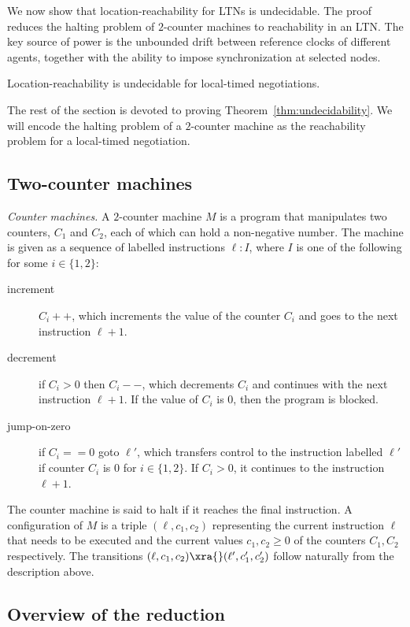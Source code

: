 We now show that location-reachability for LTNs is undecidable.  The proof reduces
the halting problem of $2$-counter machines to reachability in an LTN.  The key
source of power is the unbounded drift between reference clocks of different agents,
together with the ability to impose synchronization at selected nodes.

\begin{theorem}
\label{thm:undecidability}
Location-reachability is undecidable for local-timed negotiations.
\end{theorem}

The rest of the section is devoted to proving
Theorem~\ref{thm:undecidability}. We will encode the halting problem
of a $2$-counter machine as the reachability problem for a local-timed
negotiation.

\subsection{Two-counter machines}
\label{subsec:2cm}

\noindent \emph{Counter machines.} A $2$-counter machine $M$ is a program that manipulates two counters, $C_1$ and $C_2$,
each of which can hold a non-negative number. The machine is given as
a sequence of labelled instructions $\ell:I$, where $I$ is one of the following for some $i \in \{1, 2\}$: 
\begin{description}
\item[increment] $C_i + +$, which increments the value of the
  counter $C_i$ and goes to the next instruction
  $\ell+1$.
\item[decrement] if $C_i>0$ then $C_i- -$, which decrements $C_i$ and continues with the next instruction
  $\ell+1$. If the value of $C_i$ is $0$, then the program is blocked. 
\item[jump-on-zero] if $C_i= = 0$ goto $\ell'$, which transfers control to the instruction labelled $\ell'$ if counter $C_i$ is $0$ for
  $i\in\{1,2\}$. If $C_i>0$, it continues to the instruction $\ell+1$.
\end{description}
The counter machine is said to halt if it reaches the final
instruction. A configuration of $M$ is a triple $(\ell, c_1, c_2)$ representing the current instruction $\ell$ that needs to be executed and the current values $c_1, c_2 \ge 0$ of the counters $C_1, C_2$ respectively. The transitions $(\ell, c_1, c_2) \xra{} (\ell', c'_1, c'_2)$ follow naturally from the description above.

\subsection{Overview of the reduction}
\label{subsec:red-overview}

